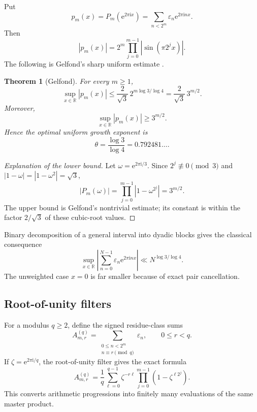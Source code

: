 \documentclass[11pt,oneside]{article}
\newtheorem{theorem}{Theorem}[section]
\theoremstyle{definition}
\theoremstyle{remark}
\newcommand{\R}{\mathbb R}
\newcommand{\e}{\mathrm e}
\newcommand{\ii}{\mathrm i}
\newcommand{\eps}{\varepsilon}
\begin{document}
Put
\begin{equation}\label{p3:eq:thue-morse-polynomial-circle}
 p_m(x)=P_m(\e^{2\pi\ii x})
 =\sum_{n<2^m}\eps_n\e^{2\pi\ii nx}.
\end{equation}
Then
\begin{equation}\label{p3:eq:p-magnitude-sine}
 |p_m(x)|=2^m\prod_{j=0}^{m-1}|\sin(\pi2^jx)|.
\end{equation}
The following is Gelfond's sharp uniform estimate
\cite{p3:gelfond1968,p3:queffelec2018}.

\begin{theorem}[Gelfond]\label{p3:thm:gelfond}
For every $m\ge1$,
\begin{equation}\label{p3:eq:gelfond-bound}
 \sup_{x\in\R}|p_m(x)|
 \le\frac{2}{\sqrt3}\,2^{m\log 3/\log4}
 =\frac{2}{\sqrt3}\,3^{m/2}.
\end{equation}
Moreover,
\begin{equation}\label{p3:eq:gelfond-lower}
 \sup_{x\in\R}|p_m(x)|\ge3^{m/2}.
\end{equation}
Hence the optimal uniform growth exponent is
\begin{equation}\label{p3:eq:gelfond-exponent}
 \theta=\frac{\log3}{\log4}=0.792481\ldots.
\end{equation}
\end{theorem}

\begin{proof}[Explanation of the lower bound]
Let $\omega=\e^{2\pi\ii/3}$.  Since $2^j\not\equiv0\pmod3$ and
$|1-\omega|=|1-\omega^2|=\sqrt3$,
\[
 |P_m(\omega)|=\prod_{j=0}^{m-1}|1-\omega^{2^j}|=3^{m/2}.
\]
The upper bound is Gelfond's nontrivial estimate; its constant is within the
factor $2/\sqrt3$ of these cubic-root values.
\end{proof}

Binary decomposition of a general interval into dyadic blocks gives the
classical consequence
\begin{equation}\label{p3:eq:gelfond-general-N}
 \sup_{x\in\R}\left|
  \sum_{n=0}^{N-1}\eps_n\e^{2\pi\ii nx}
 \right|\ll N^{\log3/\log4}.
\end{equation}
The unweighted case $x=0$ is far smaller because of exact pair cancellation.

\subsection{Root-of-unity filters}

For a modulus $q\ge2$, define the signed residue-class sums
\begin{equation}\label{p3:eq:rarefied-def}
 A_{m,r}^{(q)}=
 \sum_{\substack{0\le n<2^m\\n\equiv r\pmod q}}\eps_n,
 \qquad 0\le r<q.
\end{equation}
If $\zeta=\e^{2\pi\ii/q}$, the root-of-unity filter gives the exact formula
\begin{equation}\label{p3:eq:rarefied-root-filter}
 \boxed{\quad
 A_{m,r}^{(q)}=\frac1q\sum_{\ell=0}^{q-1}
 \zeta^{-r\ell}\prod_{j=0}^{m-1}
  \left(1-\zeta^{\ell2^j}\right).
 \quad}
\end{equation}
This converts arithmetic progressions into finitely many evaluations of the
same master product.
\end{document}
